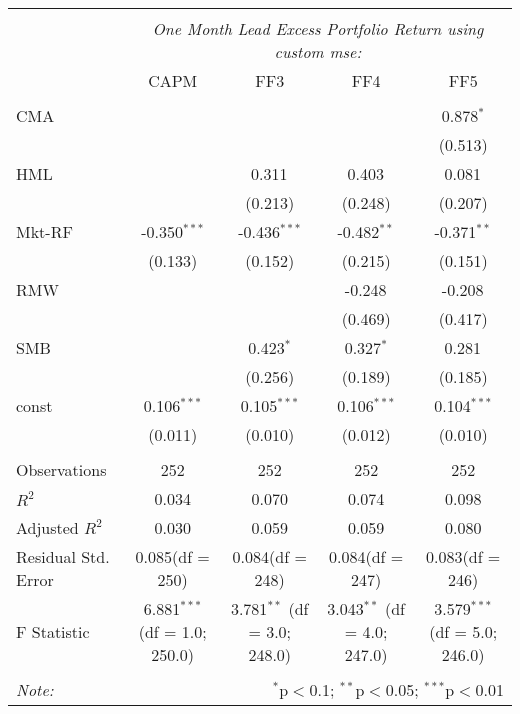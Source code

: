 \begin{table}[!htbp] \centering
\begin{tabular}{@{\extracolsep{5pt}}lcccc}
\\[-1.8ex]\hline
\hline \\[-1.8ex]
& \multicolumn{4}{c}{\textit{One Month Lead Excess Portfolio Return using custom mse:}} \
\cr \cline{4-5}
\\[-1.8ex] & CAPM & FF3 & FF4 & FF5 \\
\hline \\[-1.8ex]
 CMA & & & & 0.878$^{*}$ \\
  & & & & (0.513) \\
 HML & & 0.311$^{}$ & 0.403$^{}$ & 0.081$^{}$ \\
  & & (0.213) & (0.248) & (0.207) \\
 Mkt-RF & -0.350$^{***}$ & -0.436$^{***}$ & -0.482$^{**}$ & -0.371$^{**}$ \\
  & (0.133) & (0.152) & (0.215) & (0.151) \\
 RMW & & & -0.248$^{}$ & -0.208$^{}$ \\
  & & & (0.469) & (0.417) \\
 SMB & & 0.423$^{*}$ & 0.327$^{*}$ & 0.281$^{}$ \\
  & & (0.256) & (0.189) & (0.185) \\
 const & 0.106$^{***}$ & 0.105$^{***}$ & 0.106$^{***}$ & 0.104$^{***}$ \\
  & (0.011) & (0.010) & (0.012) & (0.010) \\
\hline \\[-1.8ex]
 Observations & 252 & 252 & 252 & 252 \\
 $R^2$ & 0.034 & 0.070 & 0.074 & 0.098 \\
 Adjusted $R^2$ & 0.030 & 0.059 & 0.059 & 0.080 \\
 Residual Std. Error & 0.085(df = 250) & 0.084(df = 248) & 0.084(df = 247) & 0.083(df = 246)  \\
 F Statistic & 6.881$^{***}$ (df = 1.0; 250.0) & 3.781$^{**}$ (df = 3.0; 248.0) & 3.043$^{**}$ (df = 4.0; 247.0) & 3.579$^{***}$ (df = 5.0; 246.0) \\
\hline
\hline \\[-1.8ex]
\textit{Note:} & \multicolumn{4}{r}{$^{*}$p$<$0.1; $^{**}$p$<$0.05; $^{***}$p$<$0.01} \\
\end{tabular}
\end{table}
